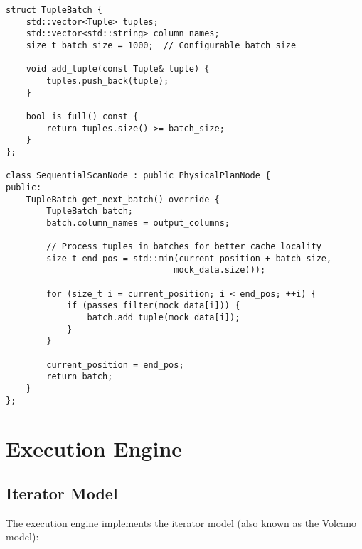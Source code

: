 \documentclass[12pt,a4paper]{article}
\begin{document}
\begin{lstlisting}[style=cpp, caption=Vectorized Batch Processing]
struct TupleBatch {
    std::vector<Tuple> tuples;
    std::vector<std::string> column_names;
    size_t batch_size = 1000;  // Configurable batch size
    
    void add_tuple(const Tuple& tuple) {
        tuples.push_back(tuple);
    }
    
    bool is_full() const {
        return tuples.size() >= batch_size;
    }
};

class SequentialScanNode : public PhysicalPlanNode {
public:
    TupleBatch get_next_batch() override {
        TupleBatch batch;
        batch.column_names = output_columns;
        
        // Process tuples in batches for better cache locality
        size_t end_pos = std::min(current_position + batch_size, 
                                 mock_data.size());
        
        for (size_t i = current_position; i < end_pos; ++i) {
            if (passes_filter(mock_data[i])) {
                batch.add_tuple(mock_data[i]);
            }
        }
        
        current_position = end_pos;
        return batch;
    }
};
\end{lstlisting}

\section{Execution Engine}

\subsection{Iterator Model}

The execution engine implements the iterator model (also known as the Volcano model):
\end{document}
